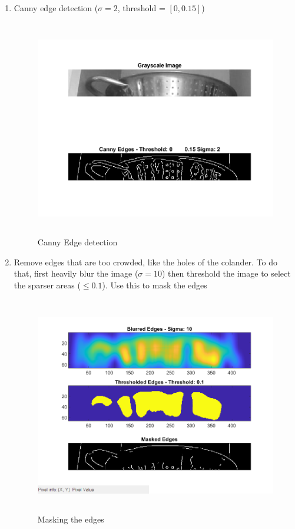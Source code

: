 \begin{enumerate}
    \item Canny edge detection ($\sigma = 2$, threshold = $[0, 0.15]$)
        \begin{figure}[H]
    \centering
    \includegraphics[height=9.5cm, width=\textwidth, keepaspectratio]{Report/Images/Features/Conic/CannyEdges.png}
    \caption{\label{fig:conic:edges}Canny Edge detection}
    \end{figure}

    \item Remove edges that are too crowded, like the holes of the colander. To do that, first heavily blur the image ($\sigma = 10$) then threshold the image to select the sparser areas ($\leq 0.1$). Use this to mask the edges
            \begin{figure}[H]
    \centering
    \includegraphics[height=9.5cm, width=\textwidth, keepaspectratio]{Report/Images/Features/Conic/MaskedEdges.png}
    \caption{\label{fig:conic:mask}Masking the edges}
    \end{figure}


\end{enumerate}
